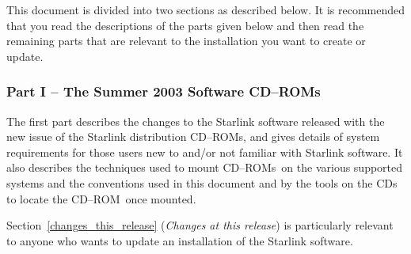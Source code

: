 \documentclass[twoside,11pt]{article}
\newcommand{\htmlref}[2]{#1}
\newcommand{\latexhtml}[2]{#1}
\renewcommand{\_}{\texttt{\symbol{95}}}
\newcommand{\cdrom}{CD--ROM}
\newcommand{\cdrom}{CD-ROM}
\newcommand{\cdroms}{CD--ROMs}
\newcommand{\cdroms}{CD-ROMs}
\begin{document}
This document is divided into two sections as described below.  It is
recommended that you read the descriptions of the parts given below and
then read the remaining parts that are relevant to the installation you
want to create or update.

\subsubsection{Part I -- The Summer 2003 Software \cdroms}

The first part describes the changes to the Starlink software released
with the new issue of the Starlink distribution \cdroms, and gives details
of system requirements for those users new to and/or not familiar with 
Starlink software.  It also describes the techniques used to mount \cdroms\
on the various supported systems and the conventions used in this document
and by the tools on the CDs to locate the \cdrom\ once mounted.

\latexhtml{Section~\ref{changes_this_release} (\textit{Changes at this
release}) is particularly relevant to anyone who wants to update an
installation of the Starlink software. }{The
\htmlref{changes}{changes_this_release} section is particularly
relevant to anyone who wants to update an installation of the Starlink
software.}






\end{document}
